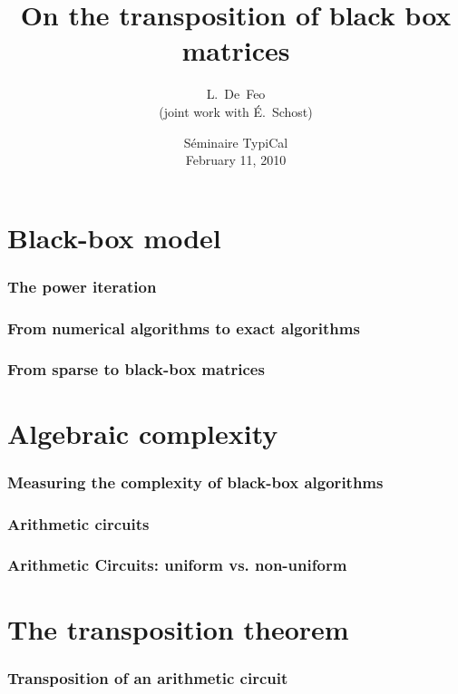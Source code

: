 \documentclass[10pt]{beamer}
\title{On the transposition of black box matrices}
\author[L. De Feo]{L.~De~Feo\\{\footnotesize(joint work with É.~Schost)}}
\institute[TANC, LIX]{Projet TANC, LIX, École Polytechnique}
\date[Typical, February 11, 2010]{Séminaire TypiCal\\February 11, 2010}
\begin{document}
\begin{frame}
  \titlepage
\end{frame}

\section{Black-box model}

\begin{frame}
  \frametitle{The power iteration}

\end{frame}


\begin{frame}
  \frametitle{From numerical algorithms to exact algorithms}

\end{frame}


\begin{frame}
  \frametitle{From sparse to black-box matrices}

\end{frame}


\section{Algebraic complexity}

\begin{frame}
  \frametitle{Measuring the complexity of black-box algorithms}

\end{frame}


\begin{frame}
  \frametitle{Arithmetic circuits}

\end{frame}


\begin{frame}
  \frametitle{Arithmetic Circuits: uniform vs. non-uniform}

\end{frame}


\section{The transposition theorem}

\begin{frame}
  \frametitle{Transposition of an arithmetic circuit}

\end{frame}
\end{document}

